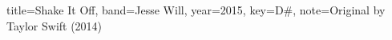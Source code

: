 \documentclass{skrul-leadsheet}
\begin{document}
\begin{song}[transpose-capo=true]{title={Shake It Off}, band={Jesse Will}, year={2015}, key={D#}, note={Original by Taylor Swift (2014)}}

\end{song}
\end{document}
